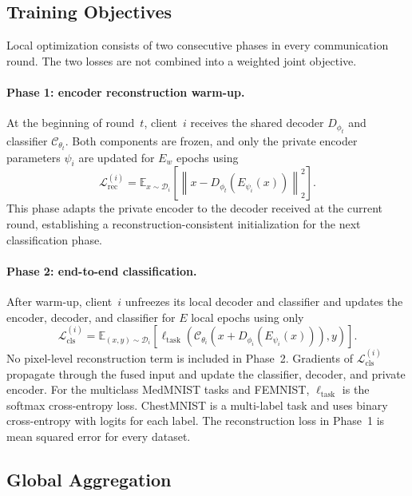 \documentclass[twoside]{article}
\theoremstyle{thmstyleone}%
\theoremstyle{thmstyletwo}%
\theoremstyle{thmstylethree}%
\begin{document}
\subsection{Training Objectives}\label{sec:training_obj}

Local optimization consists of two consecutive phases in every communication
round. The two losses are not combined into a weighted joint objective.

\paragraph{Phase 1: encoder reconstruction warm-up.}
At the beginning of round~$t$, client~$i$ receives the shared decoder
$D_{\phi_t}$ and classifier $\mathcal{C}_{\theta_t}$. Both components are
frozen, and only the private encoder parameters $\psi_i$ are updated for
$E_w$ epochs using
\begin{equation*}
\mathcal{L}_{\mathrm{rec}}^{(i)}
=
\mathbb{E}_{x\sim\mathcal{D}_i}
\left[
\left\|
x-D_{\phi_t}\!\left(E_{\psi_i}(x)\right)
\right\|_2^2
\right].
\end{equation*}
This phase adapts the private encoder to the decoder received at the current
round, establishing a reconstruction-consistent initialization for the
next classification phase.

\paragraph{Phase 2: end-to-end classification.}
After warm-up, client~$i$ unfreezes its local decoder and classifier and updates
the encoder, decoder, and classifier for $E$ local epochs using only
\begin{equation*}
\mathcal{L}_{\mathrm{cls}}^{(i)}
=
\mathbb{E}_{(x,y)\sim\mathcal{D}_i}
\left[
\ell_{\mathrm{task}}
\left(
\mathcal{C}_{\theta_i}
\left(
x+D_{\phi_i}\!\left(E_{\psi_i}(x)\right)
\right),
y
\right)
\right].
\end{equation*}
No pixel-level reconstruction term is included in Phase~2. Gradients of
$\mathcal{L}_{\mathrm{cls}}^{(i)}$ propagate through the fused input and update
the classifier, decoder, and private encoder.
For the multiclass MedMNIST tasks and FEMNIST,
$\ell_{\mathrm{task}}$ is the softmax cross-entropy loss. ChestMNIST is a
multi-label task and uses binary cross-entropy with logits for each label.
The reconstruction loss in Phase~1 is mean squared error for every dataset.

\subsection{Global Aggregation}\label{sec:aggregation}
\end{document}
